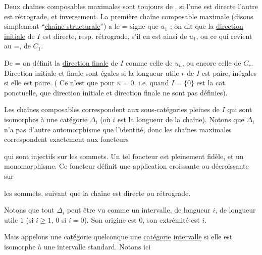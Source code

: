 Deux chaînes composables maximales sont toujours de  , si l'une est directe l'autre est rétrograde, et inversement.  La première chaîne composable maximale  (disons simplement ``\uline{chaîne structurale}'') a le $\mathord{=}$ signe que $u_1$ ;   on dit que la \uline{direction initiale} de $I$ est directe, resp. rétrograde, s'il en est ainsi de $u_1$, ou ce qui revient au $\mathord{=}$, de $C_1$.

De $\mathord{=}$ on définit la \uline{direction finale} de $I$ comme celle de $u_n$, ou encore celle de $C_r$.  Direction initiale et finale sont égales si la longueur utile $r$ de $I$ est paire, inégales si elle est paire. (\uline{} Ce n'est que pour $n=0$, i.e. quand $I=\{0\}$ est la cat. ponctuelle, que direction initiale et direction finale ne sont pas définies).

Les chaînes composables correspondent aux sous-catégories pleines de $I$ qui sont isomorphes à une catégorie $\mathbb{\Delta}_i$ (où $i$ est la longueur de la chaîne). Notons que $\mathbb{\Delta}_i$ n'a pas d'autre automorphisme que l'identité, donc les chaînes maximales  correspondent exactement aux foncteurs


qui sont  injectifs sur les sommets. Un tel foncteur est  pleinement fidèle, et un monomorphisme.  Ce foncteur définit une application  croissante ou  décroissante sur



les sommets, suivant que la chaîne est directe ou rétrograde.

Notons que tout  $\mathbb{\Delta}_i$ peut être vu comme un intervalle, de longueur $i$, de longueur utile $1$ (si $i\geq1$, $0$ si $i=0$). Son origine est $0$, son extrémité est $i$.

Mais appelons une catégorie quelconque une  \uline{catégorie} \uline{intervalle} si elle est isomorphe à une  intervalle standard. Notons ici


